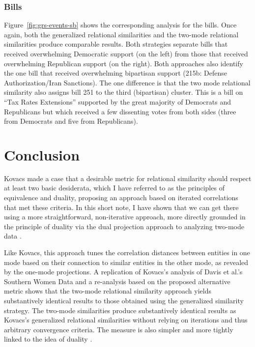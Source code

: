 \documentclass[a4paper,fleqn]{cas-sc}
\begin{document}
\subsubsection{Bills}
Figure~\ref{fig:grs-events-sb} shows the corresponding analysis for the bills. Once again, both the generalized relational similarities and the two-mode relational similarities produce comparable results. Both strategies separate bills that received overwhelming Democratic support (on the left) from those that received overwhelming Republican support (on the right). Both approaches also identify the one bill that received overwhelming bipartisan support (215b: Defense Authorization/Iran Sanctions). The one difference is that the two mode relational similarity also assigns bill 251 to the third (bipartisan) cluster. This is a bill on ``Tax Rates Extensions'' supported by the great majority of Democrats and Republicans but which received a few dissenting votes from both sides (three from Democrats and five from Republicans). 

\section{Conclusion}
Kovacs \citeyearpar{kovacs2010} made a case that a desirable metric for relational similarity should respect at least two basic desiderata, which I have referred to as the principles of equivalence and duality, proposing an approach based on iterated correlations that met these criteria. In this short note, I have shown that we can get there using a more straightforward, non-iterative approach, more directly grounded in the principle of duality via the dual projection approach to analyzing two-mode data \citep{everett2013}. 

Like Kovacs, this approach tunes the correlation distances between entities in one mode based on their connection to similar entities in the other mode, as revealed by the one-mode projections. A replication of Kovacs's analysis of Davis et al.'s \citeyearpar{davis1941} Southern Women Data and a re-analysis based on the proposed alternative metric shows that the two-mode relational similarity approach yields substantively identical results to those obtained using the generalized similarity strategy. The two-mode similarities produce substantively identical results as Kovacs's generalized relational similarities without relying on iterations and thus arbitrary convergence criteria. The measure is also simpler and more tightly linked to the idea of duality \citep{breiger1974}. 
\end{document}
